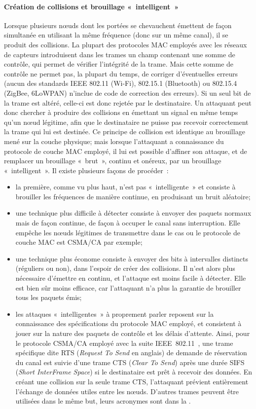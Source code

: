         \paragraph{Création de collisions et brouillage « intelligent »}
Lorsque plusieurs nœuds dont les portées se chevauchent émettent de façon simultanée en utilisant la même fréquence (donc sur un même canal), il se produit des collisions.
La plupart des protocoles MAC employés avec les réseaux de capteurs introduisent dans les trames un champ contenant une somme de contrôle, qui permet de vérifier l'intégrité de la trame.
Mais cette somme de contrôle ne permet pas, la plupart du temps, de corriger d'éventuelles erreurs (aucun des standards IEEE 802.11 (Wi-Fi), 802.15.1 (Bluetooth) ou 802.15.4 (ZigBee, 6LoWPAN) n'inclue de code de correction des erreurs).
Si un seul bit de la trame est altéré, celle-ci est donc rejetée par le destinataire.
Un attaquant peut donc chercher à produire des collisions en émettant un signal en même temps qu'un nœud légitime, afin que le destinataire ne puisse pas recevoir correctement la trame qui lui est destinée.
Ce principe de collision est identique au brouillage mené sur la couche physique; mais lorsque l'attaquant a connaissance du protocole de couche MAC employé, il lui est possible d'affiner son attaque, et de remplacer un brouillage « brut », continu et onéreux, par un brouillage « intelligent ».
Il existe plusieurs façons de procéder~\cite{PI11}:
\begin{itemize}
    \item la première, comme vu plus haut, n'est pas « intelligente » et consiste à brouiller les fréquences de manière continue, en produisant un bruit aléatoire;
    \item une technique plus difficile à détecter consiste à envoyer des paquets normaux mais de façon continue, de façon à occuper le canal sans interruption. Elle empêche les nœuds légitimes de transmettre dans le cas ou le protocole de couche MAC est CSMA/CA par exemple;
    \item une technique plus économe consiste à envoyer des bits à intervalles distincts (réguliers ou non), dans l'espoir de créer des collisions. Il n'est alors plus nécessaire d'émettre en continu, et l'attaque est moins facile à détecter. Elle est bien sûr moins efficace, car l'attaquant n'a plus la garantie de brouiller tous les paquets émis;
    \item les attaques « intelligentes » à proprement parler reposent sur la connaissance des spécifications du protocole MAC employé, et consistent à jouer sur la nature des paquets de contrôle et les délais d'attente. Ainsi, pour le protocole CSMA/CA employé avec la suite IEEE~802.11~\cite{ieee802.11}, une trame spécifique dite RTS (\textit{Request To Send} en anglais) de demande de réservation du canal est suivie d'une trame CTS (\textit{Clear To Send}) après une durée SIFS (\textit{Short InterFrame Space}) si le destinataire est prêt à recevoir des données. En créant une collision sur la seule trame CTS, l'attaquant prévient entièrement l'échange de données utiles entre les nœuds.
D'autres trames peuvent être utilisées dans le même but, leurs acronymes sont dans la .
\end{itemize}

